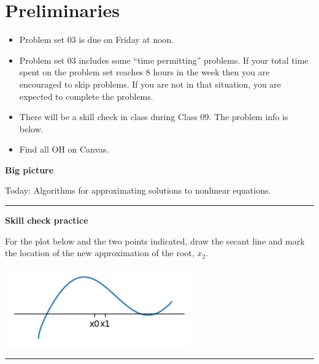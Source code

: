 \documentclass[12pt,letterpaper,noanswers]{exam}
\begin{document}
 \pdfpageheight 11in 
  \pdfpagewidth 8.5in

\noindent 

\section*{Preliminaries}

\begin{itemize}
\itemsep0pt
\item Problem set 03 is due on Friday at noon.
\item Problem set 03 includes some ``time permitting'' problems.  If your total time spent on the problem set reaches 8 hours in the week then you are encouraged to skip problems.  If you are not in that situation, you are expected to complete the problems.
\item There will be a skill check in class during Class 09.  The problem info is below.
\item Find all OH on Canvas.
\end{itemize}



\noindent\textbf{Big picture}

Today: Algorithms for approximating solutions to nonlinear equations.

\vspace{0.2cm}
\hrule
\vspace{0.2cm}

\noindent \textbf{Skill check practice}
\begin{questions}
\item For the plot below and the two points indicated, draw the secant line and mark the location of the new approximation of the root, $x_2$.

\includegraphics[width=0.6\textwidth]{img/Quiz01secant.png}

\end{questions}


\vspace{0.2cm}
\hrule
\vspace{0.2cm}
\end{document}
